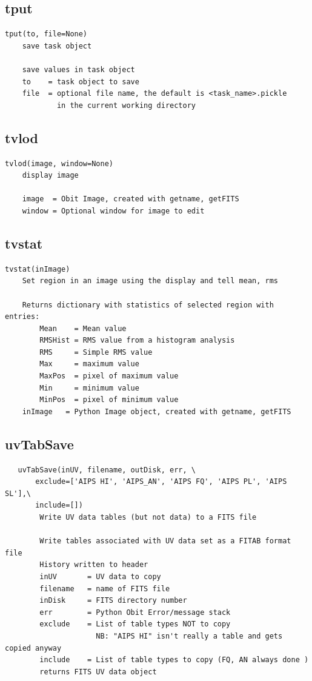 \documentclass[11pt]{report}
\begin{document}
\subsection{tput}
\begin{verbatim}
tput(to, file=None)
    save task object
    
    save values in task object
    to    = task object to save
    file  = optional file name, the default is <task_name>.pickle
            in the current working directory
\end{verbatim}

\subsection{tvlod}
\begin{verbatim}
tvlod(image, window=None)
    display image
    
    image  = Obit Image, created with getname, getFITS
    window = Optional window for image to edit
\end{verbatim}

\subsection{tvstat}
\begin{verbatim}
tvstat(inImage)
    Set region in an image using the display and tell mean, rms
    
    Returns dictionary with statistics of selected region with entries:
        Mean    = Mean value
        RMSHist = RMS value from a histogram analysis
        RMS     = Simple RMS value
        Max     = maximum value
        MaxPos  = pixel of maximum value
        Min     = minimum value
        MinPos  = pixel of minimum value
    inImage   = Python Image object, created with getname, getFITS
\end{verbatim}

\subsection{uvTabSave}
\begin{verbatim}
   uvTabSave(inUV, filename, outDisk, err, \
       exclude=['AIPS HI', 'AIPS_AN', 'AIPS FQ', 'AIPS PL', 'AIPS SL'],\
       include=[])
        Write UV data tables (but not data) to a FITS file
        
        Write tables associated with UV data set as a FITAB format file
        History written to header
        inUV       = UV data to copy
        filename   = name of FITS file
        inDisk     = FITS directory number
        err        = Python Obit Error/message stack
        exclude    = List of table types NOT to copy
                     NB: "AIPS HI" isn't really a table and gets copied anyway
        include    = List of table types to copy (FQ, AN always done )
        returns FITS UV data object
\end{verbatim}
\end{document}
